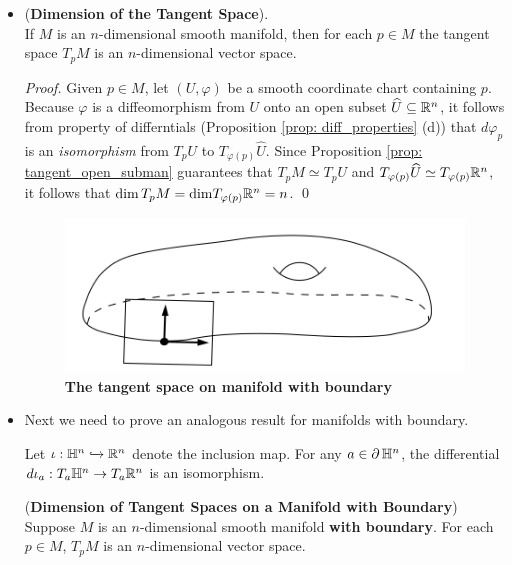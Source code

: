 \documentclass[11pt]{article}
\begin{document}
\begin{itemize}
\item \begin{proposition} (\textbf{Dimension of the Tangent Space}).\\
If $M$ is an $n$-dimensional smooth manifold, then for each $p \in M$ the tangent space $T_{p}M$ is an $n$-dimensional vector space.
\end{proposition}
\begin{proof}
Given $p \in M$, let $(U, \varphi)$ be a smooth coordinate chart containing $p$. Because $\varphi$ is a diffeomorphism from $U$ onto an open subset $\widehat{U} \subseteq {\mathbb R}^n$, it follows from property of differntials (Proposition \ref{prop: diff_properties} (d)) that $d\varphi_p$ is an \emph{isomorphism} from $T_{p}U$ to $T_{\varphi(p)}\widehat{U}$. Since Proposition \ref{prop: tangent_open_subman} guarantees that $T_{p}M \simeq T_{p}U$ and $T_{\varphi(p)}\widehat{U} \simeq T_{\varphi(p)}{\mathbb R}^{n}$, it follows that $\text{dim}\, T_{p}M  = \text{dim}T_{\varphi(p)}{\mathbb R}^{n} = n$. \qed
\end{proof}

\begin{figure}
\begin{minipage}[t]{1\linewidth}
  \centering
  \centerline{\includegraphics[scale = 0.6]{tangent_space_boundary.png}}
\end{minipage}
\caption{\footnotesize{\textbf{The tangent space on manifold with boundary \citep{lee2003introduction}}}}
\label{fig: tangent_space_boundary}
\end{figure}


\item Next we need to prove an analogous result for manifolds with boundary.
\begin{lemma}
Let $\iota: {\mathbb H}^n \xhookrightarrow{} {\mathbb R}^n$ denote the inclusion map. For any $a \in \partial\,{\mathbb H}^n$, the differential $d\iota_a: T_{a}{\mathbb H}^n \rightarrow T_{a}{\mathbb R}^n$ is an isomorphism.
\end{lemma}

\begin{proposition} (\textbf{Dimension of Tangent Spaces on a Manifold with Boundary}) \citep{lee2003introduction}\\
Suppose $M$ is an $n$-dimensional smooth manifold \textbf{with boundary}. For each $p \in M$, $T_{p}M$ is an $n$-dimensional vector space.
\end{proposition}


\end{itemize}
\end{document}
